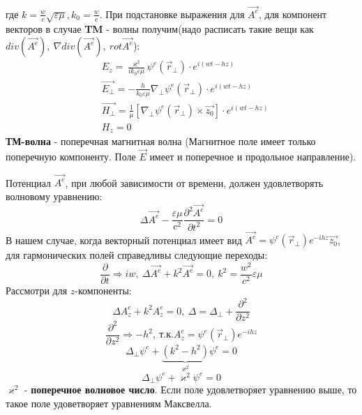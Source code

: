 где $k = \frac{w}{c}\sqrt{\varepsilon\mu}, k_0 = \frac{w}{c}$. При подстановке выражения для $\vec{A^e}$, для компонент
векторов в случае \textbf{TM} - волны получим(надо расписать такие вещи как $div(\vec{A^e}),~ \nabla div(\vec{A^e}),~rot \vec{A^e}$):
\begin{align*}
  &E_z = \frac{\varkappa^2}{ik_0\varepsilon\mu} \psi^e(\vec{r}_{\perp})\cdot e^{i(wt-hz)}\\
  &\vec{E_{\perp}} = -\frac{h}{k_0\varepsilon\mu}\nabla_{\perp} \psi^e(\vec{r}_{\perp})\cdot e^{i(wt-hz)}\\
  &\vec{H_{\perp}} = \frac{1}{\mu}[\nabla_{\perp} \psi^e(\vec{r}_{\perp})\times\vec{z_0}]\cdot e^{i(wt-hz)}\\
  &H_z = 0
\end{align*}
\textbf{ТМ-волна} - поперечная магнитная волна (Магнитное поле имеет только поперечную компоненту. Поле $\vec{E}$ имеет и поперечное и
продольное направление). 

Потенциал $\vec{A^e}$, при любой зависимости от времени, должен удовлетворять волновому уравнению:
\begin{equation}
  \Delta \vec{A^e} - \frac{\varepsilon\mu}{c^2} \frac{\partial^2\vec{A^e}}{\partial t^2} = 0
\end{equation}
В нашем случае, когда векторный потенциал имеет вид $\vec{A^e} = \psi^e(\vec{r}_{\perp})e^{-ihz}\vec{z_0}$, для
гармонических полей справедливы следующие переходы:
\begin{equation}
  \frac{\partial}{\partial t} \Rightarrow iw,~ \Delta \vec{A^e} + k^2 \vec{A^e} =0,~ k^2 = \frac{w^2}{c^2}\varepsilon\mu
\end{equation}
Рассмотри для $z$-компоненты:
\begin{equation}
  \Delta A^e_z + k^2 A^e_z =0,~ \Delta = \Delta_{\perp} + \frac{\partial^2}{\partial z^2}
\end{equation}
\begin{equation}
  \frac{\partial^2}{\partial z^2} \Rightarrow -h^2,~ \text{т.к.} A^e_z = \psi^e(\vec{r}_{\perp})e^{-ihz}
\end{equation}
\begin{equation}
  \Delta_{\perp}\psi^e+\underbrace{(k^2-h^2)}_{\varkappa^2}\psi^e=0
\end{equation}
\begin{equation}
  \Delta_{\perp}\psi^e+\varkappa^2\psi^e=0
\end{equation}
$\varkappa^2$ - \textbf{поперечное волновое число}. Если поле удовлетворяет уравнению выше, то такое поле удоветворяет
уравнениям Максвелла.

